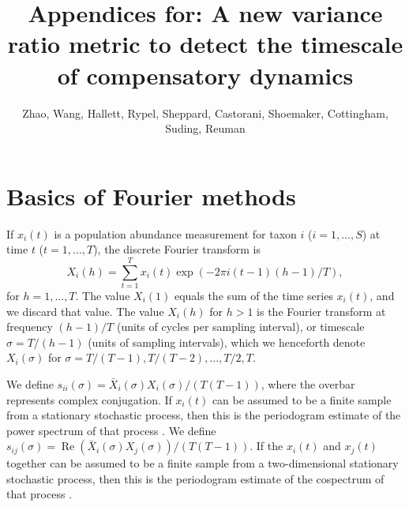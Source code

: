 \documentclass[letterpaper,11pt]{article}
\newcommand{\Rp}{{\operatorname{Re}}}
\begin{document}
\title{Appendices for: A new variance ratio metric to detect the timescale of compensatory dynamics}
\author{Zhao, Wang, Hallett, Rypel, Sheppard, Castorani, Shoemaker, Cottingham, Suding, Reuman}
\date{}
\maketitle

\section{Basics of Fourier methods}\label{sec:spec}
\noindent If $x_i(t)$ is a population abundance measurement for taxon $i$ 
($i=1,\ldots,S$) at time $t$ ($t=1,\ldots,T$), the discrete Fourier transform is 
\begin{equation}
X_i(h)=\sum_{t=1}^T x_i(t) \exp(-2 \pi i (t-1)(h-1)/T),
\end{equation}
for $h=1,\ldots,T$. The value $X_i(1)$ equals the sum of the time series $x_i(t)$,
and we discard that value. The value $X_i(h)$ for $h>1$ is the Fourier transform 
at frequency $(h-1)/T$ (units of cycles per sampling interval), or timescale 
$\sigma=T/(h-1)$ (units of sampling intervals), which we henceforth
denote $X_i(\sigma)$ for $\sigma=T/(T-1),T/(T-2),\ldots,T/2,T$.

We define $s_{ii}(\sigma)=\bar{X}_i(\sigma) X_i(\sigma)/(T(T-1))$, where the overbar
represents complex conjugation. If $x_i(t)$
can be assumed to be a finite sample from a stationary stochastic 
process, then this is the periodogram estimate of the power spectrum of that
process \citep{Brillinger2001}. We define 
$s_{ij}(\sigma)=\Rp(\bar{X}_i(\sigma) X_j(\sigma))/(T(T-1))$. If the $x_i(t)$
and $x_j(t)$ together can be assumed to be a finite sample from a two-dimensional
stationary stochastic process, then this is the periodogram estimate of the 
cospectrum of that process \citep{Brillinger2001}. 
\end{document}
